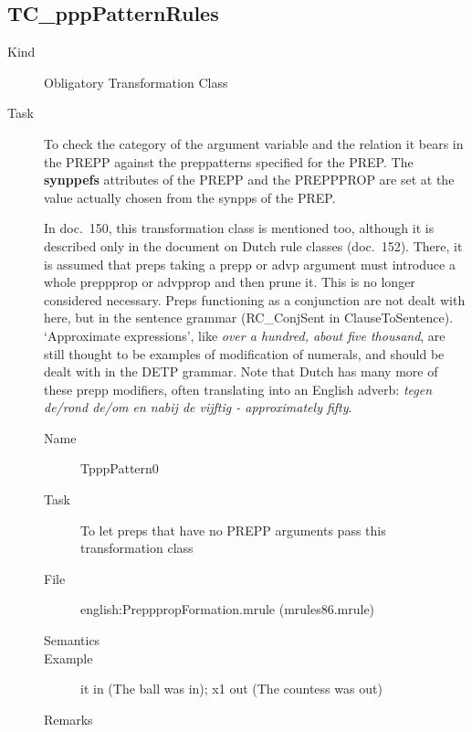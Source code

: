 \subsection{TC\_pppPatternRules}
\begin{description}
\item[Kind] Obligatory Transformation Class
\item[Task] To check the category of the argument variable and the relation 
it bears in the PREPP against the preppatterns specified for the PREP. The {\bf 
synppefs} attributes of the PREPP and the PREPPPROP are set at the value 
actually chosen from the synpps of the PREP.

In doc.\ 150, this transformation class is mentioned too, although it is 
described only in the document on Dutch rule classes (doc.\ 152). There, it is 
assumed that preps taking a prepp or advp argument must introduce a whole 
preppprop or advpprop and then prune it. This is no longer considered 
necessary. Preps functioning as a conjunction are not dealt with here, but in 
the sentence grammar (RC\_ConjSent in ClauseToSentence). `Approximate 
expressions', like {\em over a hundred, about five thousand\/}, are still 
thought to be examples of modification of numerals, and should be dealt with in 
the DETP grammar. Note that Dutch has many more of these prepp modifiers, often 
translating into an English adverb: {\em tegen de/rond de/om en nabij de 
vijftig - approximately fifty\/}.

\vspace{1 cm}
\begin{description}
\item[Name] TpppPattern0
\item[Task] To let preps that have no PREPP arguments pass this transformation 
class
\item[File] english:PrepppropFormation.mrule (mrules86.mrule)
\item[Semantics]
\item[Example] it in (The ball was in); x1 out (The countess was out)
\item[Remarks]
\end{description}


\end{description}
